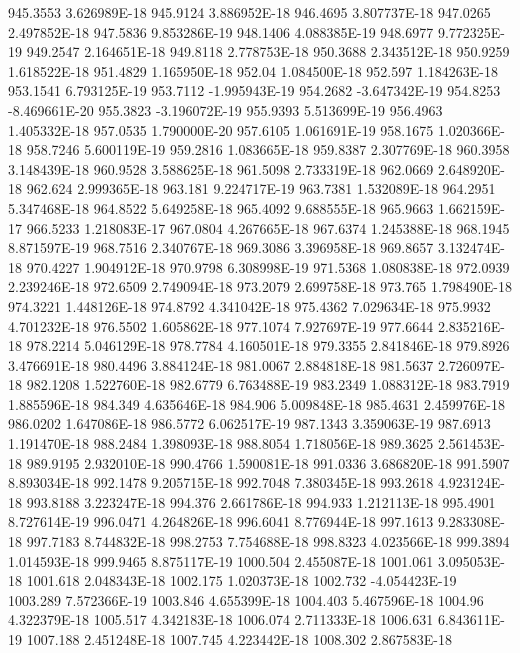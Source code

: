 945.3553  3.626989E-18
945.9124  3.886952E-18
946.4695  3.807737E-18
947.0265  2.497852E-18
947.5836  9.853286E-19
948.1406  4.088385E-19
948.6977  9.772325E-19
949.2547  2.164651E-18
949.8118  2.778753E-18
950.3688  2.343512E-18
950.9259  1.618522E-18
951.4829  1.165950E-18
952.04  1.084500E-18
952.597  1.184263E-18
953.1541  6.793125E-19
953.7112  -1.995943E-19
954.2682  -3.647342E-19
954.8253  -8.469661E-20
955.3823  -3.196072E-19
955.9393  5.513699E-19
956.4963  1.405332E-18
957.0535  1.790000E-20
957.6105  1.061691E-19
958.1675  1.020366E-18
958.7246  5.600119E-19
959.2816  1.083665E-18
959.8387  2.307769E-18
960.3958  3.148439E-18
960.9528  3.588625E-18
961.5098  2.733319E-18
962.0669  2.648920E-18
962.624  2.999365E-18
963.181  9.224717E-19
963.7381  1.532089E-18
964.2951  5.347468E-18
964.8522  5.649258E-18
965.4092  9.688555E-18
965.9663  1.662159E-17
966.5233  1.218083E-17
967.0804  4.267665E-18
967.6374  1.245388E-18
968.1945  8.871597E-19
968.7516  2.340767E-18
969.3086  3.396958E-18
969.8657  3.132474E-18
970.4227  1.904912E-18
970.9798  6.308998E-19
971.5368  1.080838E-18
972.0939  2.239246E-18
972.6509  2.749094E-18
973.2079  2.699758E-18
973.765  1.798490E-18
974.3221  1.448126E-18
974.8792  4.341042E-18
975.4362  7.029634E-18
975.9932  4.701232E-18
976.5502  1.605862E-18
977.1074  7.927697E-19
977.6644  2.835216E-18
978.2214  5.046129E-18
978.7784  4.160501E-18
979.3355  2.841846E-18
979.8926  3.476691E-18
980.4496  3.884124E-18
981.0067  2.884818E-18
981.5637  2.726097E-18
982.1208  1.522760E-18
982.6779  6.763488E-19
983.2349  1.088312E-18
983.7919  1.885596E-18
984.349  4.635646E-18
984.906  5.009848E-18
985.4631  2.459976E-18
986.0202  1.647086E-18
986.5772  6.062517E-19
987.1343  3.359063E-19
987.6913  1.191470E-18
988.2484  1.398093E-18
988.8054  1.718056E-18
989.3625  2.561453E-18
989.9195  2.932010E-18
990.4766  1.590081E-18
991.0336  3.686820E-18
991.5907  8.893034E-18
992.1478  9.205715E-18
992.7048  7.380345E-18
993.2618  4.923124E-18
993.8188  3.223247E-18
994.376  2.661786E-18
994.933  1.212113E-18
995.4901  8.727614E-19
996.0471  4.264826E-18
996.6041  8.776944E-18
997.1613  9.283308E-18
997.7183  8.744832E-18
998.2753  7.754688E-18
998.8323  4.023566E-18
999.3894  1.014593E-18
999.9465  8.875117E-19
1000.504  2.455087E-18
1001.061  3.095053E-18
1001.618  2.048343E-18
1002.175  1.020373E-18
1002.732  -4.054423E-19
1003.289  7.572366E-19
1003.846  4.655399E-18
1004.403  5.467596E-18
1004.96  4.322379E-18
1005.517  4.342183E-18
1006.074  2.711333E-18
1006.631  6.843611E-19
1007.188  2.451248E-18
1007.745  4.223442E-18
1008.302  2.867583E-18
